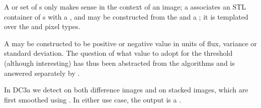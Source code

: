 A  or set of s only makes sense in the 
context of an image; a  associates an STL container of 
s with a , and may be constructed from 
the  and a ; it is templated over the 
 and  pixel types.

A  may be constructed to be positive or negative value in 
units of flux, variance or standard deviation. The question of what value to 
adopt for the threshold (although interesting) has thus been abstracted from 
the algorithms and is answered separately by . 

In DC3a we detect on both difference images and on stacked images, which are 
first smoothed using . In either use case, the output
is a .

